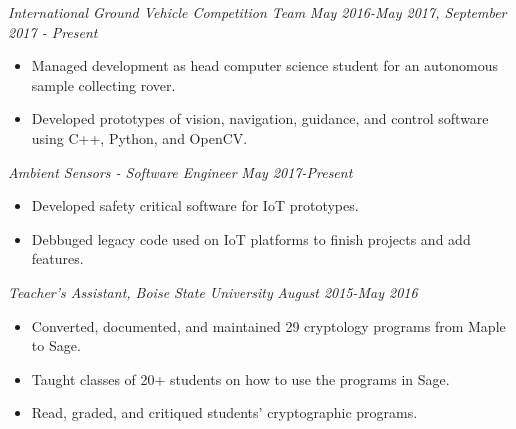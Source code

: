 \documentclass[letterpaper]{article}
\begin{document}
\vspace{.10in}

\begin{multicols}{2}
\textit{International Ground Vehicle Competition Team}
\vfill
\columnbreak
\textit{May 2016-May 2017, September 2017 - Present}
\end{multicols}
\begin{itemize}
    \item Managed development as head computer science student for an autonomous sample collecting rover.
    \item Developed prototypes of vision, navigation, guidance, and control software using C++, Python, and OpenCV. 
\end{itemize}

\begin{multicols}{2}
\textit{Ambient Sensors - Software Engineer}
\vfill
\columnbreak
\textit{May 2017-Present}
\end{multicols}
\begin{itemize}
    \item Developed safety critical software for IoT prototypes.
    \item Debbuged legacy code used on IoT platforms to finish projects and add features.
\end{itemize}

\vspace{.10in}
\begin{multicols}{2}
\textit{ Teacher's Assistant, Boise State University}
\vfill
\columnbreak
\textit{August 2015-May 2016}
\end{multicols}
\begin{itemize}
    \item Converted, documented, and maintained 29 cryptology programs from Maple to Sage.
    \item Taught classes of 20+ students on how to use the programs in Sage.
    \item Read, graded, and critiqued students' cryptographic programs.
\end{itemize}
\end{document}
